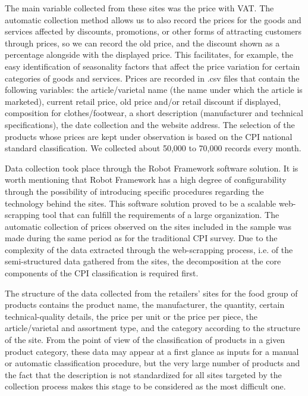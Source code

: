 \documentclass[]{article}
\begin{document}
The main variable collected from these sites was the price with VAT. The automatic collection method allows us to also 
record the prices for the goods and services affected by discounts, promotions, or other forms of attracting customers
through prices, so we can record the old price, and the discount shown as a percentage alongside with the displayed price. 
This facilitates, for example, the easy identification of seasonality factors that affect the price variation for
certain categories of goods and services. Prices are recorded in .csv files that contain the following variables: 
the article/varietal name (the name under which the article is marketed), current retail price, old price and/or 
retail discount if displayed, composition for clothes/footwear, a short description (manufacturer and technical 
specifications), the date collection and the website address. The selection of the products whose prices are kept
under observation is based on the CPI national standard classification. We collected about 50,000 to 70,000 records every month.


Data collection took place through the Robot Framework software solution. It is worth mentioning that Robot Framework
has a high degree of configurability through the possibility of introducing specific procedures regarding the technology
behind the sites. This software solution proved to be a scalable web-scrapping tool that can fulfill the requirements of a 
large organization. The automatic collection of prices observed on the sites included in the sample was made during
the same period as for the traditional CPI survey. Due to the complexity of the data extracted through the 
web-scrapping process, i.e. of the semi-structured data gathered from the sites, the decomposition at the 
core components of the CPI classification is required first.


The structure of the data collected from the retailers’ sites for the food group of products contains the product 
name, the manufacturer, the quantity, certain technical-quality details, the price per unit or the price per piece, 
the article/varietal and assortment type, and the category according to the structure of the site. From the point of view 
of the classification of products in a given product category, these data may appear at a first glance 
as inputs for a manual or automatic classification procedure, but the very large number of products and the fact 
that the description is not standardized for all sites targeted by the collection process makes this stage to be considered as the most difficult one.
\end{document}
